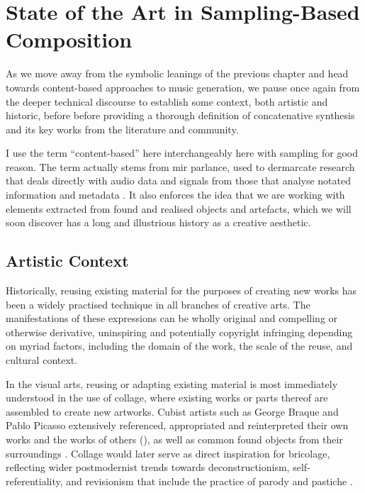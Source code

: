 \chapter{State of the Art in Sampling-Based Composition}
\label{chap:sota}

As we move away from the symbolic leanings of the previous chapter and head towards content-based approaches to music generation, we pause once again from the deeper technical discourse to establish some context, both artistic and historic, before before providing a thorough definition of concatenative synthesis and its key works from the literature and community.

I use the term ``content-based'' here interchangeably here with sampling for good reason. The term actually stems from \acrshort{mir} parlance, used to dermarcate research that deals  directly with audio data and signals from those that analyse notated information and metadata \citep{Veltkamp2008, Casey2008a}. It also enforces the idea that we are working with elements extracted from found and realised objects and artefacts, which we will soon discover has a long and illustrious history as a creative aesthetic.  

\section{Artistic Context}

Historically, reusing existing material for the purposes of creating new works has been a widely practised technique in all branches of creative arts. The manifestations of these expressions can be wholly original and compelling or otherwise derivative, uninspiring and potentially copyright infringing depending on myriad factors, including the domain of the work, the scale of the reuse, and cultural context.

In the visual arts, reusing or adapting existing material is most immediately understood in the use of collage, where existing works or parts thereof are assembled to create new artworks. Cubist artists such as George Braque and Pablo Picasso extensively referenced, appropriated and reinterpreted their own works and the works of others (), as well as common found objects from their surroundings \citep{Greenberg1971}. Collage would later serve as direct inspiration for bricolage, reflecting wider postmodernist trends towards deconstructionism, self-referentiality,  and revisionism that include the practice of parody and pastiche \citep{Lochhead2002}. 

